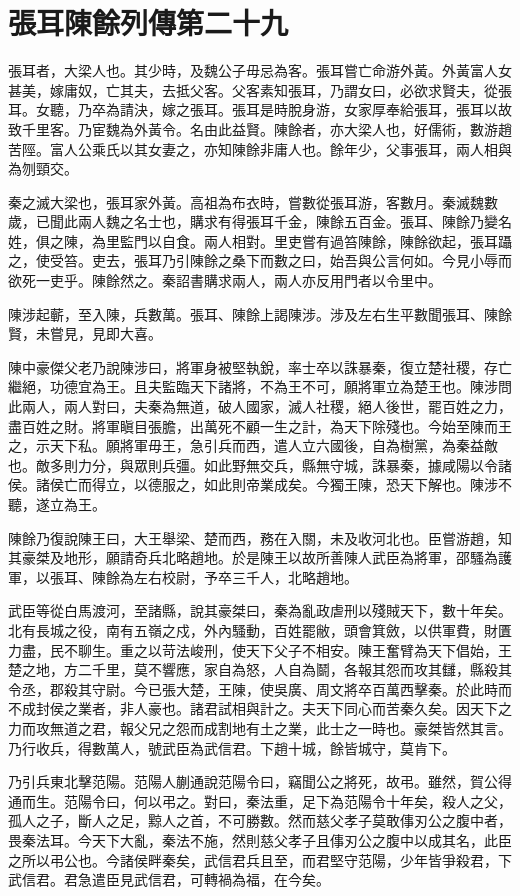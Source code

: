 \chapter{張耳陳餘列傳第二十九}

張耳者，大梁人也。其少時，及魏公子毋忌為客。張耳嘗亡命游外黃。外黃富人女甚美，嫁庸奴，亡其夫，去抵父客。父客素知張耳，乃謂女曰，必欲求賢夫，從張耳。女聽，乃卒為請決，嫁之張耳。張耳是時脫身游，女家厚奉給張耳，張耳以故致千里客。乃宦魏為外黃令。名由此益賢。陳餘者，亦大梁人也，好儒術，數游趙苦陘。富人公乘氏以其女妻之，亦知陳餘非庸人也。餘年少，父事張耳，兩人相與為刎頸交。

秦之滅大梁也，張耳家外黃。高祖為布衣時，嘗數從張耳游，客數月。秦滅魏數歲，已聞此兩人魏之名士也，購求有得張耳千金，陳餘五百金。張耳、陳餘乃變名姓，俱之陳，為里監門以自食。兩人相對。里吏嘗有過笞陳餘，陳餘欲起，張耳躡之，使受笞。吏去，張耳乃引陳餘之桑下而數之曰，始吾與公言何如。今見小辱而欲死一吏乎。陳餘然之。秦詔書購求兩人，兩人亦反用門者以令里中。

陳涉起蘄，至入陳，兵數萬。張耳、陳餘上謁陳涉。涉及左右生平數聞張耳、陳餘賢，未嘗見，見即大喜。

陳中豪傑父老乃說陳涉曰，將軍身被堅執銳，率士卒以誅暴秦，復立楚社稷，存亡繼絕，功德宜為王。且夫監臨天下諸將，不為王不可，願將軍立為楚王也。陳涉問此兩人，兩人對曰，夫秦為無道，破人國家，滅人社稷，絕人後世，罷百姓之力，盡百姓之財。將軍瞋目張膽，出萬死不顧一生之計，為天下除殘也。今始至陳而王之，示天下私。願將軍毋王，急引兵而西，遣人立六國後，自為樹黨，為秦益敵也。敵多則力分，與眾則兵彊。如此野無交兵，縣無守城，誅暴秦，據咸陽以令諸侯。諸侯亡而得立，以德服之，如此則帝業成矣。今獨王陳，恐天下解也。陳涉不聽，遂立為王。

陳餘乃復說陳王曰，大王舉梁、楚而西，務在入關，未及收河北也。臣嘗游趙，知其豪桀及地形，願請奇兵北略趙地。於是陳王以故所善陳人武臣為將軍，邵騷為護軍，以張耳、陳餘為左右校尉，予卒三千人，北略趙地。

武臣等從白馬渡河，至諸縣，說其豪桀曰，秦為亂政虐刑以殘賊天下，數十年矣。北有長城之役，南有五嶺之戍，外內騷動，百姓罷敝，頭會箕斂，以供軍費，財匱力盡，民不聊生。重之以苛法峻刑，使天下父子不相安。陳王奮臂為天下倡始，王楚之地，方二千里，莫不響應，家自為怒，人自為鬬，各報其怨而攻其讎，縣殺其令丞，郡殺其守尉。今已張大楚，王陳，使吳廣、周文將卒百萬西擊秦。於此時而不成封侯之業者，非人豪也。諸君試相與計之。夫天下同心而苦秦久矣。因天下之力而攻無道之君，報父兄之怨而成割地有土之業，此士之一時也。豪桀皆然其言。乃行收兵，得數萬人，號武臣為武信君。下趙十城，餘皆城守，莫肯下。

乃引兵東北擊范陽。范陽人蒯通說范陽令曰，竊聞公之將死，故弔。雖然，賀公得通而生。范陽令曰，何以弔之。對曰，秦法重，足下為范陽令十年矣，殺人之父，孤人之子，斷人之足，黥人之首，不可勝數。然而慈父孝子莫敢倳刃公之腹中者，畏秦法耳。今天下大亂，秦法不施，然則慈父孝子且倳刃公之腹中以成其名，此臣之所以弔公也。今諸侯畔秦矣，武信君兵且至，而君堅守范陽，少年皆爭殺君，下武信君。君急遣臣見武信君，可轉禍為福，在今矣。


